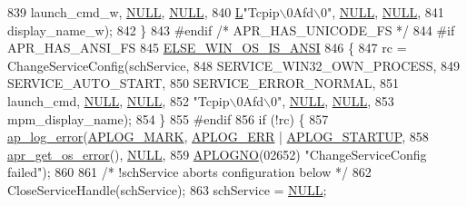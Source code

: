 \begin{DoxyCode}
{{{839                                       launch\_cmd\_w, \hyperlink{pcre_8txt_ad7f989d16aa8ca809a36bc392c07fba1}{NULL}, \hyperlink{pcre_8txt_ad7f989d16aa8ca809a36bc392c07fba1}{NULL},
840                                       \hyperlink{mod__lua_8h_a62f94dfc0036bec0c14106c2f15caf3e}{L}\textcolor{stringliteral}{"Tcpip\(\backslash\)0Afd\(\backslash\)0"}, \hyperlink{pcre_8txt_ad7f989d16aa8ca809a36bc392c07fba1}{NULL}, \hyperlink{pcre_8txt_ad7f989d16aa8ca809a36bc392c07fba1}{NULL},
841                                       display\_name\_w);
842         \}
843 \textcolor{preprocessor}{#endif }\textcolor{comment}{/* APR\_HAS\_UNICODE\_FS */}\textcolor{preprocessor}{}
844 \textcolor{preprocessor}{#if APR\_HAS\_ANSI\_FS}
845         \hyperlink{win32_2apr__arch__misc_8h_a2d1423da7a6a46da1276017c8140be22}{ELSE\_WIN\_OS\_IS\_ANSI}
846         \{
847             rc = ChangeServiceConfig(schService,
848                                      SERVICE\_WIN32\_OWN\_PROCESS,
849                                      SERVICE\_AUTO\_START,
850                                      SERVICE\_ERROR\_NORMAL,
851                                      launch\_cmd, \hyperlink{pcre_8txt_ad7f989d16aa8ca809a36bc392c07fba1}{NULL}, \hyperlink{pcre_8txt_ad7f989d16aa8ca809a36bc392c07fba1}{NULL},
852                                      \textcolor{stringliteral}{"Tcpip\(\backslash\)0Afd\(\backslash\)0"}, \hyperlink{pcre_8txt_ad7f989d16aa8ca809a36bc392c07fba1}{NULL}, \hyperlink{pcre_8txt_ad7f989d16aa8ca809a36bc392c07fba1}{NULL},
853                                      mpm\_display\_name);
854         \}
855 \textcolor{preprocessor}{#endif}
856         \textcolor{keywordflow}{if} (!rc) \{
857             \hyperlink{group__APACHE__CORE__LOG_ga5e6676c87418af7a1d323a116c78ecb4}{ap\_log\_error}(\hyperlink{group__APACHE__CORE__LOG_ga655e126996849bcb82e4e5a14c616f4a}{APLOG\_MARK}, \hyperlink{group__APACHE__CORE__LOG_ga57ad94ed8c92c4306de90479251a5d58}{APLOG\_ERR} | 
      \hyperlink{group__APACHE__CORE__LOG_ga39efd19b052fb6f39d8f263c16cc82b7}{APLOG\_STARTUP},
858                          \hyperlink{group__apr__errno_gaa76e122da00af0ce2e8c8d7ff538bdfa}{apr\_get\_os\_error}(), \hyperlink{pcre_8txt_ad7f989d16aa8ca809a36bc392c07fba1}{NULL},
859                          \hyperlink{group__APACHE__CORE__LOG_ga1dee8a07e06bc5b3de8b89662c2cd666}{APLOGNO}(02652) \textcolor{stringliteral}{"ChangeServiceConfig failed"});
860 
861             \textcolor{comment}{/* !schService aborts configuration below */}
862             CloseServiceHandle(schService);
863             schService = \hyperlink{pcre_8txt_ad7f989d16aa8ca809a36bc392c07fba1}{NULL};
}}}
\end{DoxyCode}
